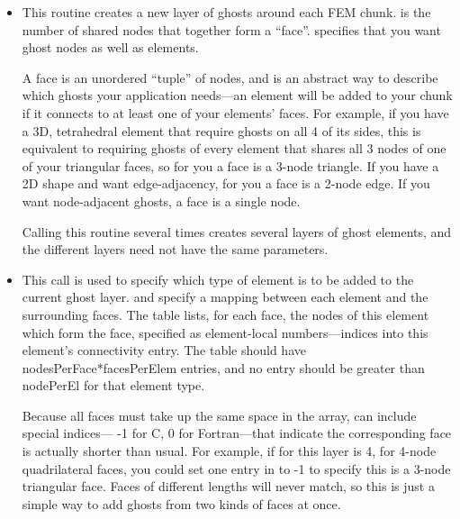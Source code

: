 \begin{itemize}
\item

This routine creates a new layer of ghosts around each FEM chunk.  is the number of shared nodes that together form a ``face''.  specifies that you want ghost nodes as well as elements.

A face is an unordered ``tuple'' of nodes, and is an abstract way to describe which ghosts
your application needs---an element will be added to your chunk if it connects to at 
least one of your elements' faces.  For example, if you have a 3D, tetrahedral element that require ghosts 
on all 4 of its sides, this is equivalent to requiring ghosts of every element that shares all 3
nodes of one of your triangular faces, so for you a face is a 3-node triangle.  If you have a 2D shape
and want edge-adjacency, for you a face is a 2-node edge.  If you want node-adjacent ghosts,
a face is a single node.

Calling this routine several times creates several layers of ghost elements, and the different layers need not have the same parameters.

\item
{}

This call is used to specify which type of element is to be added to the current ghost layer.  and  specify a mapping between each element and the surrounding faces.  The  table lists, for each face, the nodes of this element which form the face, specified as element-local numbers---indices into this element's connectivity entry. The  table should have nodesPerFace*facesPerElem entries, and no entry should be greater than nodePerEl for that element type.

Because all faces must take up the same space in the array,
 can include special indices--- -1 for C, 0 for Fortran---that indicate the
corresponding face is actually shorter than usual.  For example, if  for this layer
is 4, for 4-node quadrilateral faces, you could set one entry in  to -1 to specify
this is a 3-node triangular face.  Faces of different lengths will never match, so this is just
a simple way to add ghosts from two kinds of faces at once.

\end{itemize}

